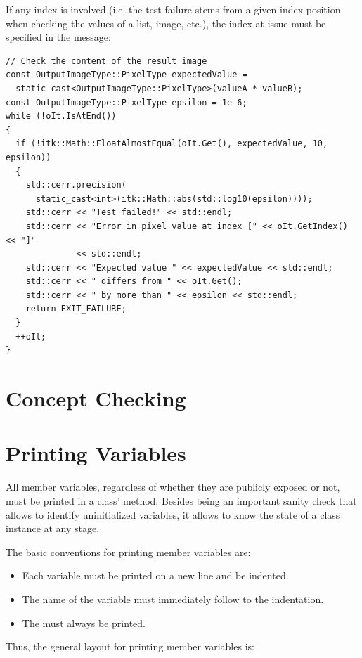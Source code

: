 If any index is involved (i.e. the test failure stems from a given index
position when checking the values of a list, image, etc.), the index at issue
must be specified in the message:

\small
\begin{verbatim}
// Check the content of the result image
const OutputImageType::PixelType expectedValue =
  static_cast<OutputImageType::PixelType>(valueA * valueB);
const OutputImageType::PixelType epsilon = 1e-6;
while (!oIt.IsAtEnd())
{
  if (!itk::Math::FloatAlmostEqual(oIt.Get(), expectedValue, 10, epsilon))
  {
    std::cerr.precision(
      static_cast<int>(itk::Math::abs(std::log10(epsilon))));
    std::cerr << "Test failed!" << std::endl;
    std::cerr << "Error in pixel value at index [" << oIt.GetIndex() << "]"
              << std::endl;
    std::cerr << "Expected value " << expectedValue << std::endl;
    std::cerr << " differs from " << oIt.Get();
    std::cerr << " by more than " << epsilon << std::endl;
    return EXIT_FAILURE;
  }
  ++oIt;
}
\end{verbatim}
\normalsize


\section{Concept Checking}%
\label{sec:ConceptChecking}


\section{Printing Variables}%
\label{sec:PrintingVariables}

All member variables, regardless of whether they are publicly exposed or not,
must be printed in a class'  method. Besides being an
important sanity check that allows to identify uninitialized variables, it
allows to know the state of a class instance at any stage.

The basic conventions for printing member variables are:
\begin{itemize}
\item Each variable must be printed on a new line and be indented.
\item The name of the variable must immediately follow to the indentation.
\item The  must always be printed.
\end{itemize}

Thus, the general layout for printing member variables is:

